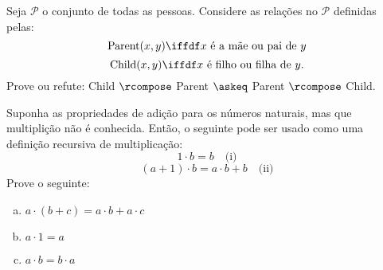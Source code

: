 \begin{exercise}
	Seja $\mathcal{P}$ o conjunto de todas as pessoas. Considere as relações no $\mathcal{P}$ definidas pelas:
	$$
		\text{Parent}(x,y)\iffdf x \text{ é a mãe ou pai de } y
	$$
	$$
		\text{Child}(x,y)\iffdf x \text{ é filho ou filha de } y.
	$$
	Prove ou refute: Child $\rcompose$ Parent $\askeq$ Parent $\rcompose$ Child.
\end{exercise}

\begin{exercise}
	Suponha as propriedades de adição para os números naturais, mas que multiplição não é conhecida. Então, o seguinte pode ser usado como uma definição recursiva de multiplicação:
	$$
		1 \cdot b = b \quad \text{(i)}
	$$
	$$
		(a + 1) \cdot b = a \cdot b + b \quad \text{(ii)}
	$$
	Prove o seguinte:
	\begin{enumerate}[(a)]
		\item $a \cdot (b + c) = a \cdot b + a \cdot c$
		\item $a \cdot 1 = a$
		\item $a \cdot b = b \cdot a$
	\end{enumerate}
\end{exercise}

